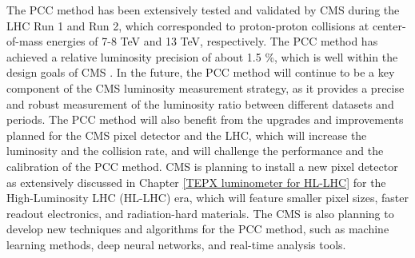 The PCC method has been extensively tested and validated by CMS during the LHC Run 1 and Run 2, which corresponded to proton-proton collisions at center-of-mass energies of 7-8 TeV and 13 TeV, respectively. The PCC method has achieved a relative luminosity precision of about 1.5 \%, which is well within the design goals of CMS \cite{pas_18}. In the future, the PCC method will continue to be a key component of the CMS luminosity measurement strategy, as it provides a precise and robust measurement of the luminosity ratio between different datasets and periods. The PCC method will also benefit from the upgrades and improvements planned for the CMS pixel detector and the LHC, which will increase the luminosity and the collision rate, and will challenge the performance and the calibration of the PCC method. CMS is planning to install a new pixel detector as extensively discussed in Chapter \ref{TEPX luminometer for HL-LHC} for the High-Luminosity LHC (HL-LHC) era, which will feature smaller pixel sizes, faster readout electronics, and radiation-hard materials. The CMS is also planning to develop new techniques and algorithms for the PCC method, such as machine learning methods, deep neural networks, and real-time analysis tools.

